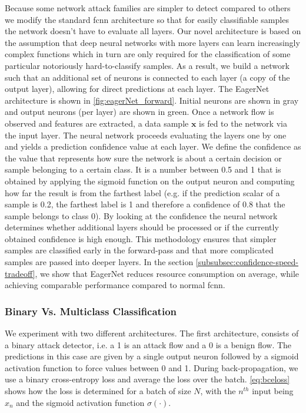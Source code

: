 \documentclass[conference]{IEEEtran}
\begin{document}
Because some network attack families are simpler to detect compared to others we modify the standard \gls{fcnn} architecture so that for easily classifiable samples the network doesn't have to evaluate all layers. Our novel architecture is based on the assumption that deep neural networks with more layers can learn increasingly complex functions which in turn are only required for the classification of some particular notoriously hard-to-classify samples. As a result, we build a network such that an additional set of neurons is connected to each layer (a copy of the output layer), allowing for direct predictions at each layer. The EagerNet architecture is shown in \autoref{fig:eagerNet_forward}. Initial neurons are shown in gray and output neurons (per layer) are shown in green. Once a network flow is observed and features are extracted, a data sample $\textbf{x}$ is fed to the network via the input layer. The neural network proceeds evaluating the layers one by one and yields a prediction confidence value at each layer. We define the confidence as the value that represents how sure the network is about a certain decision or sample belonging to a certain class. It is a number between 0.5 and 1 that is obtained by applying the sigmoid function \cite{noauthor_sigmoid_2020} on the output neuron and computing how far the result is from the farthest label (e.g. if the prediction scalar of a sample is 0.2, the farthest label is 1 and therefore a confidence of 0.8 that the sample belongs to class 0). By looking at the confidence the neural network determines whether additional layers should be processed or if the currently obtained confidence is high enough. This methodology ensures that simpler samples are classified early in the forward-pass and that more complicated samples are passed into deeper layers. In the section \ref{subsubsec:confidence-speed-tradeoff}, we show that EagerNet reduces resource consumption on average, while achieving comparable performance compared to normal \gls{fcnn}.




\subsubsection{Binary Vs. Multiclass Classification}
We experiment with two different architectures. The first architecture, consists of a binary attack detector, i.e. a 1 is an attack flow and a 0 is a benign flow. The predictions in this case are given by a single output neuron followed by a sigmoid activation function to force values between 0 and 1. During back-propagation, we use a binary cross-entropy loss and average the loss over the batch. \autoref{eq:bceloss} shows how the loss is determined for a batch of size $N$, with the $n^{th}$ input being $x_{n}$ and the sigmoid activation function $\sigma(\cdot)$.
\end{document}
